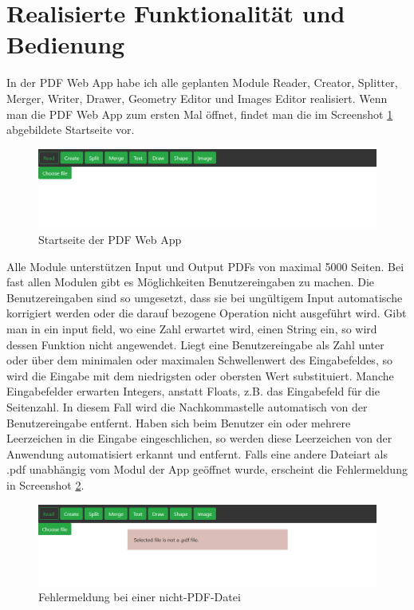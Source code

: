 \section{Realisierte Funktionalität und Bedienung}
In der PDF Web App habe ich alle geplanten Module Reader, Creator, Splitter, Merger, Writer, Drawer, Geometry Editor und Images Editor realisiert. Wenn man die PDF Web App zum ersten Mal öffnet, findet man die im Screenshot \ref{fig:start} abgebildete Startseite vor.

\begin{figure}[!htbp]
	\centering
	\includegraphics[width=1\textwidth]{"images/startseite.png"}
	\caption{Startseite der PDF Web App}
	\label{fig:start}
\end{figure}

Alle Module unterstützen Input und Output PDFs von maximal 5000 Seiten. Bei fast allen Modulen gibt es Möglichkeiten Benutzereingaben zu machen. Die Benutzereingaben sind so umgesetzt, dass sie bei ungültigem Input automatische korrigiert werden oder die darauf bezogene Operation nicht ausgeführt wird. Gibt man in ein input field, wo eine Zahl erwartet wird, einen String ein, so wird dessen Funktion nicht angewendet. Liegt eine Benutzereingabe als Zahl unter oder über dem minimalen oder maximalen Schwellenwert des Eingabefeldes, so wird die Eingabe mit dem niedrigsten oder obersten Wert substituiert. Manche Eingabefelder erwarten Integers, anstatt Floats, z.B. das Eingabefeld für die Seitenzahl. In diesem Fall wird die Nachkommastelle automatisch von der Benutzereingabe entfernt. Haben sich beim Benutzer ein oder mehrere Leerzeichen in die Eingabe eingeschlichen, so werden diese Leerzeichen von der Anwendung automatisiert erkannt und entfernt. Falls eine andere Dateiart als .pdf unabhängig vom Modul der App geöffnet wurde, erscheint die Fehlermeldung in Screenshot \ref{fig:errorfile}. 

\begin{figure}[!htbp]
	\centering
	\includegraphics[width=1\textwidth]{"images/errorfile.png"}
	\caption{Fehlermeldung bei einer nicht-PDF-Datei}
	\label{fig:errorfile}
\end{figure}

